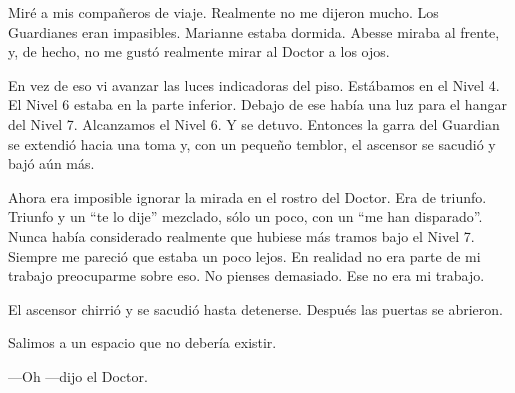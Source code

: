 Miré a mis compañeros de viaje. Realmente no me dijeron mucho. Los
Guardianes eran impasibles. Marianne estaba dormida. Abesse miraba al
frente, y, de hecho, no me gustó realmente mirar al Doctor a los ojos.

En vez de eso vi avanzar las luces indicadoras del piso. Estábamos en el
Nivel 4. El Nivel 6 estaba en la parte inferior. Debajo de ese había una
luz para el hangar del Nivel 7. Alcanzamos el Nivel 6. Y se detuvo.
Entonces la garra del Guardian se extendió hacia una toma y, con un
pequeño temblor, el ascensor se sacudió y bajó aún más.

Ahora era imposible ignorar la mirada en el rostro del Doctor. Era de
triunfo. Triunfo y un ``te lo dije'' mezclado, sólo un poco, con un ``me
han disparado''. Nunca había considerado realmente que hubiese más
tramos bajo el Nivel 7. Siempre me pareció que estaba un poco lejos. En
realidad no era parte de mi trabajo preocuparme sobre eso. No pienses
demasiado. Ese no era mi trabajo.

El ascensor chirrió y se sacudió hasta detenerse. Después las puertas se
abrieron.

Salimos a un espacio que no debería existir.

---Oh ---dijo el Doctor.